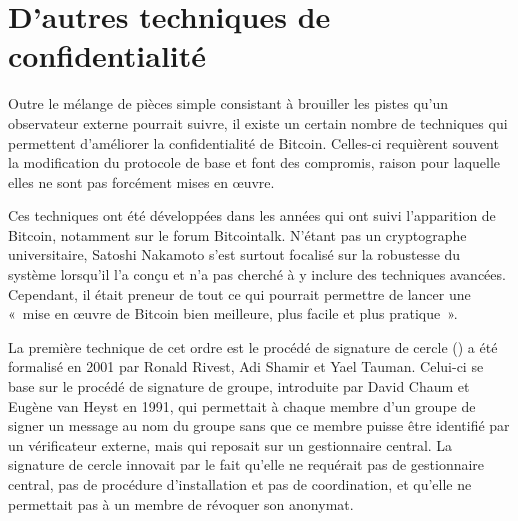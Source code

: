 \section*{D'autres techniques de confidentialité}


Outre le mélange de pièces simple consistant à brouiller les pistes qu'un observateur externe pourrait suivre, il existe un certain nombre de techniques qui permettent d'améliorer la confidentialité de Bitcoin. Celles-ci requièrent souvent la modification du protocole de base et font des compromis, raison pour laquelle elles ne sont pas forcément mises en œuvre.

Ces techniques ont été développées dans les années qui ont suivi l'apparition de Bitcoin, notamment sur le forum Bitcointalk. N'étant pas un cryptographe universitaire, Satoshi Nakamoto s'est surtout focalisé sur la robustesse du système lorsqu'il l'a conçu et n'a pas cherché à y inclure des techniques avancées. Cependant, il était preneur de tout ce qui pourrait permettre de lancer une «~mise en œuvre de Bitcoin bien meilleure, plus facile et plus pratique~».



La première technique de cet ordre est le procédé de signature de cercle () a été formalisé en 2001 par Ronald Rivest, Adi Shamir et Yael Tauman. Celui-ci se base sur le procédé de signature de groupe, introduite par David Chaum et Eugène van Heyst en 1991, qui permettait à chaque membre d'un groupe de signer un message au nom du groupe sans que ce membre puisse être identifié par un vérificateur externe, mais qui reposait sur un gestionnaire central. La signature de cercle innovait par le fait qu'elle ne requérait pas de gestionnaire central, pas de procédure d'installation et pas de coordination, et qu'elle ne permettait pas à un membre de révoquer son anonymat.

